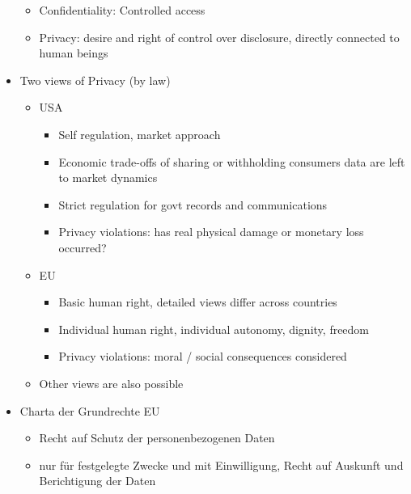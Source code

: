 \documentclass[a4paper,12pt]{scrartcl}
\begin{document}
\begin{itemize}
\begin{itemize}
			\item
				Confidentiality: Controlled access
			\item
				Privacy: desire and right of control over disclosure, directly connected to human beings
		\end{itemize}
	\item
		Two views of Privacy (by law)
		\begin{itemize}
			\item
				USA 
				\begin{itemize}
					\item
						Self regulation, market approach
					\item
						Economic trade-offs of sharing or withholding consumers data are left to market dynamics
					\item
						Strict regulation for govt records and communications
					\item
						Privacy violations: has real physical damage or monetary loss occurred?
				\end{itemize}
			\item
				EU
				\begin{itemize}
					\item
						Basic human right, detailed views differ across countries
					\item
						Individual human right, individual autonomy, dignity, freedom
					\item
						Privacy violations: moral / social consequences considered
				\end{itemize}
			\item
				Other views are also possible
		\end{itemize}
	\item
		Charta der Grundrechte EU
		\begin{itemize}
			\item
				Recht auf Schutz der personenbezogenen Daten
			\item
				nur für festgelegte Zwecke und mit Einwilligung, Recht auf Auskunft und Berichtigung der Daten
		\end{itemize}
\end{itemize}
\end{document}
